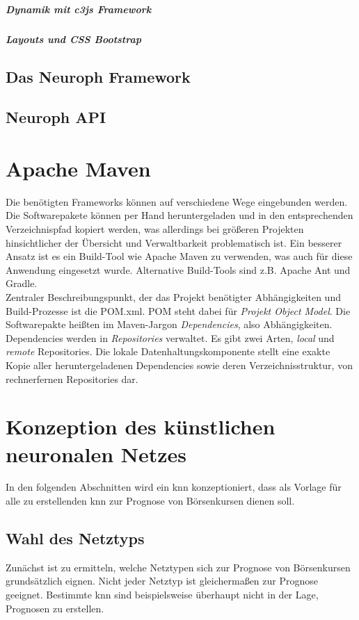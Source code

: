 \subparagraph{Dynamik mit c3js Framework}

\subparagraph{Layouts und CSS Bootstrap}


\subsection{Das Neuroph Framework} 
 
\subsection{Neuroph API} 

\label{subsection:Das Neuroph Framework} 

\section{Apache Maven}
Die benötigten Frameworks können auf verschiedene Wege eingebunden werden. Die Softwarepakete können per Hand heruntergeladen und in den entsprechenden Verzeichnispfad kopiert werden, was allerdings bei größeren Projekten hinsichtlicher der Übersicht und Verwaltbarkeit problematisch ist. Ein besserer Ansatz ist es ein Build-Tool wie Apache Maven zu verwenden, was auch für diese Anwendung eingesetzt wurde. Alternative Build-Tools sind z.B. Apache Ant und Gradle.\\
Zentraler Beschreibungspunkt, der das Projekt benötigter Abhängigkeiten und Build-Prozesse ist die POM.xml. POM steht dabei für \emph{Projekt Object Model}.
Die Softwarepakte heißten im Maven-Jargon \emph{Dependencies}, also Abhängigkeiten. Dependencies werden in \emph{Repositories} verwaltet. Es gibt zwei Arten, \emph{local} und \emph{remote} Repositories.   
Die lokale Datenhaltungskomponente stellt eine exakte Kopie aller heruntergeladenen Dependencies sowie deren Verzeichnisstruktur, von rechnerfernen Repositories dar. 


\section{Konzeption des künstlichen neuronalen Netzes}
\label{section:Konzeption des künstlichen neuronalen Netzes}

In den folgenden Abschnitten wird ein \acs{knn} konzeptioniert, dass als Vorlage für alle zu erstellenden \acs{knn} zur Prognose von Börsenkursen dienen soll. 

\subsection{Wahl des Netztyps}
\label{subsection:Wahl des Netztyps}
Zunächst ist zu ermitteln, welche Netztypen sich zur Prognose von Börsenkursen grundsätzlich eignen. Nicht jeder Netztyp ist gleichermaßen zur Prognose geeignet. Bestimmte \acs{knn} sind beispielsweise überhaupt nicht in der Lage, Prognosen zu erstellen. 

